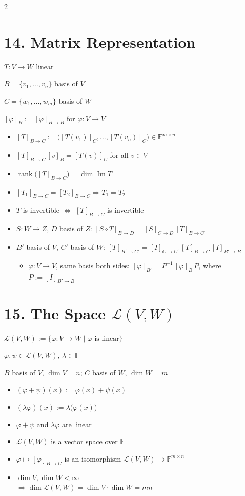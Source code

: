 \documentclass[fleqn]{article}
\begin{document}
\begin{multicols}{2}
\section*{14. Matrix Representation}
$T:V \to W$ linear

$B=\{v_1,\dots,v_n\}$ basis of $V$

$C=\{w_1,\dots,w_m\}$ basis of $W$

$[\varphi]_B := [\varphi]_{B \to B}$ for $\varphi:V \to V$

\begin{itemize}
\item $[T]_{B \to C} := \big([T(v_1)]_C, \dots, [T(v_n)]_C\big) \in \mathbb{F}^{m\times n}$
\item $[T]_{B \to C}\,[v]_B = [T(v)]_C$ for all $v \in V$
\item $\operatorname{rank}\big([T]_{B \to C}\big) = \dim \operatorname{Im}T$
\item $[T_1]_{B \to C} = [T_2]_{B \to C} \Rightarrow T_1 = T_2$
\item {\color{red}$T$ is invertible $\iff$ $[T]_{B \to C}$ is invertible}
\item $S:W \to Z$, $D$ basis of $Z$: $[S \circ T]_{B \to D} = [S]_{C \to D}\,[T]_{B \to C}$
\item $B'$ basis of $V$, $C'$ basis of $W$: $[T]_{B' \to C'} = [I]_{C \to C'}\,[T]_{B \to C}\,[I]_{B' \to B}$
\begin{itemize}
\item $\varphi:V \to V$, same basis both sides: $[\varphi]_{B'} = P^{-1}\,[\varphi]_B\,P$, where $P := [I]_{B' \to B}$
\end{itemize}
\end{itemize}

\section*{15. The Space $\mathcal{L}(V,W)$}
$\mathcal{L}(V,W) := \{\varphi : V \to W \mid \varphi \text{ is linear}\}$

$\varphi,\psi \in \mathcal{L}(V,W)$, $\lambda \in \mathbb{F}$

$B$ basis of $V$, $\dim V = n$; $C$ basis of $W$, $\dim W = m$
\begin{itemize}
\item $(\varphi+\psi)(x) := \varphi(x)+\psi(x)$
\item $(\lambda\varphi)(x) := \lambda\big(\varphi(x)\big)$
\item $\varphi+\psi$ and $\lambda\varphi$ are linear
\item $\mathcal{L}(V,W)$ is a vector space over $\mathbb{F}$
\item $\varphi \mapsto [\varphi]_{B \to C}$ is an isomorphism $\mathcal{L}(V,W) \to \mathbb{F}^{m\times n}$
\item $\dim V,\dim W<\infty$ \\
$\Rightarrow \dim \mathcal{L}(V,W) = \dim V \cdot \dim W = mn$
\end{itemize}


\end{multicols}
\end{document}

